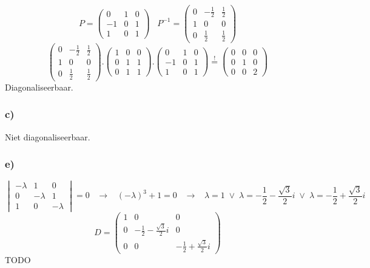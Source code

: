 \documentclass[11pt]{article}
\begin{document}
\[
P = 
\begin{pmatrix}
0 & 1 & 0\\
-1 & 0 & 1\\
1 & 0 & 1
\end{pmatrix}
\;\;\;
P^{-1} = 
\begin{pmatrix}
0 & -\frac{1}{2} & \frac{1}{2}\\
1 & 0 & 0\\
0 & \frac{1}{2} & \frac{1}{2}
\end{pmatrix}
\]
\[
\begin{pmatrix}
0 & -\frac{1}{2} & \frac{1}{2}\\
1 & 0 & 0\\
0 & \frac{1}{2} & \frac{1}{2}
\end{pmatrix}
.
\begin{pmatrix}
1 & 0 & 0\\
0 & 1 & 1\\
0 & 1 & 1
\end{pmatrix}
.
\begin{pmatrix}
0 & 1 & 0\\
-1 & 0 & 1\\
1 & 0 & 1
\end{pmatrix}
 \overset{!}{=} 
\begin{pmatrix}
0 & 0 & 0\\
0 & 1 & 0\\
0 & 0 & 2
\end{pmatrix}
\]
Diagonaliseerbaar.

\subsubsection*{c)}
Niet diagonaliseerbaar.

\subsubsection*{e)}
\[
\begin{vmatrix}
-\lambda & 1 & 0\\
0 & - \lambda & 1 \\
1 & 0 & -\lambda
\end{vmatrix}
=0
\;\;\;\longrightarrow\;\;\;
(-\lambda)^3 + 1 = 0
\;\;\;\longrightarrow\;\;\;
\lambda = 1 \;\vee\; \lambda = -\frac{1}{2}-\frac{\sqrt{3}}{2}i \;\vee\; \lambda = -\frac{1}{2}+\frac{\sqrt{3}}{2}i
\]
\[
D = 
\begin{pmatrix}
1 & 0 & 0\\
0 & -\frac{1}{2}-\frac{\sqrt{3}}{2}i & 0\\
0 & 0 & -\frac{1}{2}+\frac{\sqrt{3}}{2}i
\end{pmatrix}
\]
TODO
\end{document}
